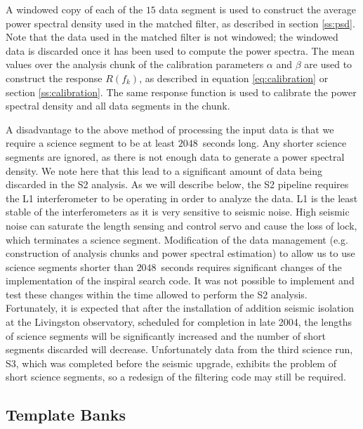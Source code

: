 A windowed copy of each of the $15$ data segment is used to construct the
average power spectral density used in the matched filter, as described in
section \ref{ss:psd}. Note that the data used in the matched filter is not
windowed; the windowed data is discarded once it has been used to compute the
power spectra.  The mean values over the analysis chunk of the calibration
parameters $\alpha$ and $\beta$ are used to construct the response $R(f_k)$,
as described in equation \ref{eq:calibration} or section \ref{ss:calibration}.
The same response function is used to calibrate the power spectral density and
all data segments in the chunk. 

A disadvantage to the above method of processing the input data is that we
require a science segment to be at least $2048$~seconds long. Any shorter
science segments are ignored, as there is not enough data to generate a power
spectral density. We note here that this lead to a significant amount of data
being discarded in the S2 analysis. As we will describe below, the S2 pipeline
requires the L1 interferometer to be operating in order to analyze the data.
L1 is the least stable of the interferometers as it is very sensitive to
seismic noise. High seismic noise can saturate the length sensing and control
servo and cause the loss of lock, which terminates a science segment.
Modification of the data management (e.g. construction of analysis chunks and
power spectral estimation) to allow us to use science segments shorter than
$2048$~seconds requires significant changes of the implementation of the
inspiral search code. It was not possible to implement and test these changes
within the time allowed to perform the S2 analysis. Fortunately, it is
expected that after the installation of addition seismic isolation at the
Livingston observatory, scheduled for completion in late 2004, the lengths of
science segments will be significantly increased and the number of short
segments discarded will decrease. Unfortunately data from the third science
run, S3, which was completed before the seismic upgrade, exhibits the problem
of short science segments, so a redesign of the filtering code may still be
required.

\subsection{Template Banks}
\label{ss:templatebank}

